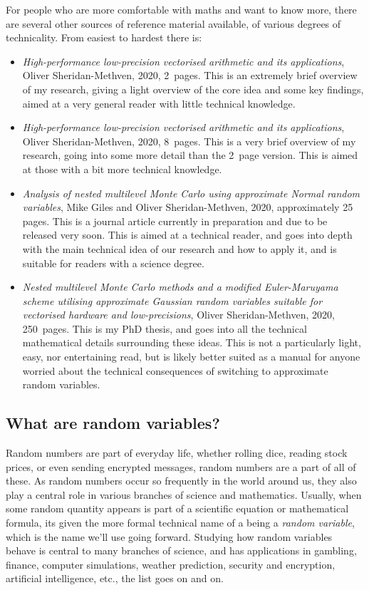 \documentclass[11pt,a4paper,oneside,english]{extarticle}
\begin{document}
For people who are more comfortable with maths and want to know more, there are several other sources of reference material available, of various degrees of technicality. From easiest to hardest there is:
\begin{itemize}
\item \emph{High-performance low-precision vectorised arithmetic and its applications}, Oliver Sheridan-Methven, 2020, 2~pages. This is an extremely brief overview of my research, giving a light overview of the core idea and some key findings, aimed at a very general reader with little technical knowledge. 

\item \emph{High-performance low-precision vectorised arithmetic and its applications}, Oliver Sheridan-Methven, 2020, 8~pages. This is a very brief overview of my research, going into some more detail than the 2~page version. This is aimed at those with a bit more technical knowledge. 

\item \emph{Analysis of nested multilevel Monte Carlo using approximate Normal random variables}, Mike Giles and Oliver Sheridan-Methven, 2020,  approximately 25 pages. This is a journal article currently in preparation and due to be released very soon. This is aimed at a technical reader, and goes into depth with the main technical idea of our research and how to apply it, and is suitable for readers with a science degree.

\item \emph{Nested multilevel Monte Carlo methods and a modified Euler-Maruyama scheme utilising approximate Gaussian random variables suitable for vectorised hardware and low-precisions}, Oliver Sheridan-Methven, 2020, 250~pages. This is my PhD thesis, and goes into all the technical mathematical details surrounding these ideas. This is not a particularly light, easy, nor entertaining read, but is likely better suited as a manual for anyone worried about the technical consequences of switching to approximate random variables. 
\end{itemize}


\subsection{What are random variables?}

Random numbers are part of everyday life, whether rolling dice, reading stock prices, or even sending encrypted messages, random numbers are a part of all of these. As random numbers occur so frequently in the world around us, they also play a central role in various branches of science and mathematics. Usually, when some random quantity appears is part of a scientific equation or mathematical formula, its given the more formal technical name of a being a \emph{random variable}, which is the name we'll use going forward. Studying how random variables behave is central to many branches of science, and has applications in gambling, finance, computer simulations, weather prediction, security and encryption, artificial intelligence, etc., the list goes on and on.  
\end{document}
